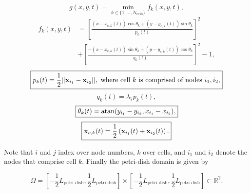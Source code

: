 \begin{equation}
    \boxed{
    g(x,y,t) = \min_{k \in \{  1, ..., N_{\textrm{cells}}\}} f_k (x,y,t),
    }
\end{equation}
\begin{equation}
    \boxed{
    \begin{split}
    f_k(x,y,t) &= \left[\frac{ (x-x_{c,k}(t))\cos{\theta_k} + (y-y_{c,k}(t)) \sin{\theta_k}}{p_k(t)} \right]^2 \\ 
               &+ \left[ \frac{-(x-x_{c,k}(t))\sin{\theta_k} +(y-y_{c,k}(t)) \cos{\theta_k}}{q_k(t)} \right]^2 - 1,
    \end{split}
    }
\end{equation}
\begin{equation}
    \boxed{p_k(t) = \frac{1}{2}||\vb{x}_{i_1} - \vb{x}_{i_2}||, \ 
    \textrm{where cell} \ k \ \textrm{is comprised of nodes} \ i_1, i_2,} 
\end{equation}
\begin{equation}
    \boxed{q_k(t) = \lambda_7 p_k(t), }
\end{equation}
\begin{equation}
    \boxed{\theta_k(t) = \atan (y_{i_1} - y_{i_2},x_{i_1} - x_{i_2} ), }
\end{equation}
\begin{equation} \label{eqn:centerPos}
    \boxed{ \vb{x}_{c,k}(t) = \frac{1}{2} \left(\vb{x}_{i_1}(t) + \vb{x}_{i_2}(t)\right). }
\end{equation}

Note that $i$ and $j$ index over node numbers, $k$ over cells, and $i_1$ and $i_2$ denote the nodes
that comprise cell $k$. Finally the petri-dish domain is given by 

\begin{equation}
    \boxed{\Omega = \left[-\frac{1}{2}L_{\textrm{petri-dish}},\frac{1}{2}L_{\textrm{petri-dish}} \right] \times
             \left[-\frac{1}{2}L_{\textrm{petri-dish}},\frac{1}{2}L_{\textrm{petri-dish}} \right] \subset \mathbb{R}^2.}
\end{equation}


